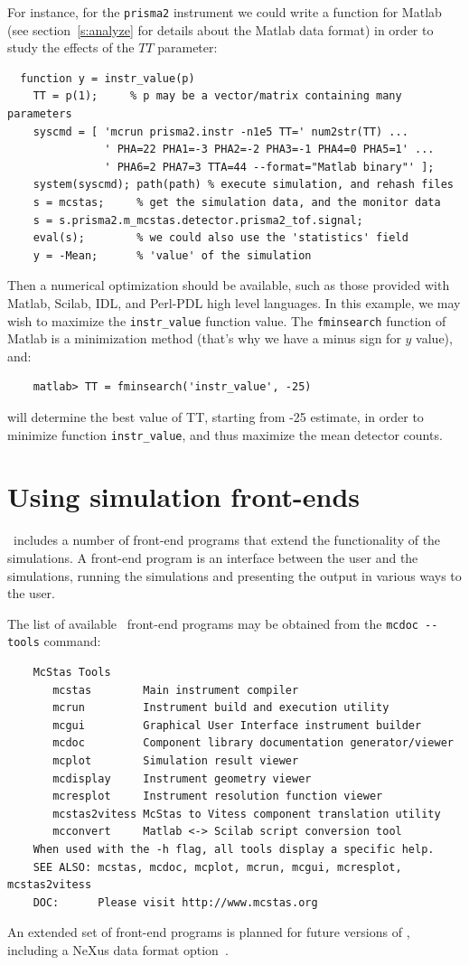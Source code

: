 For instance, for the \verb+prisma2+ instrument we could write a function for Matlab (see section~\ref{s:analyze} for details about the Matlab data format) in order to study the effects of the $TT$ parameter:
\begin{verbatim}
  function y = instr_value(p)
    TT = p(1);     % p may be a vector/matrix containing many parameters
    syscmd = [ 'mcrun prisma2.instr -n1e5 TT=' num2str(TT) ...
               ' PHA=22 PHA1=-3 PHA2=-2 PHA3=-1 PHA4=0 PHA5=1' ...
               ' PHA6=2 PHA7=3 TTA=44 --format="Matlab binary"' ];
    system(syscmd); path(path) % execute simulation, and rehash files
    s = mcstas;     % get the simulation data, and the monitor data
    s = s.prisma2.m_mcstas.detector.prisma2_tof.signal;
    eval(s);        % we could also use the 'statistics' field
    y = -Mean;      % 'value' of the simulation
\end{verbatim}

Then a numerical optimization should be available, such as those provided with Matlab, Scilab, IDL, and Perl-PDL high level languages. In this example, we may wish to maximize the \verb+instr_value+ function value. The \verb+fminsearch+ function of Matlab is a minimization method (that's why we have a minus sign for $y$ value), and:
\begin{verbatim}
    matlab> TT = fminsearch('instr_value', -25)
\end{verbatim}
will determine the best value of TT, starting from -25 estimate, in order to minimize function \verb+instr_value+, and thus maximize the mean detector counts.

\section{Using simulation front-ends}
\label{s:frontends}

\MCS\ includes a number of front-end programs that extend the
functionality of the simulations. A front-end program is an interface
between the user and the simulations, running the simulations and
presenting the output in various ways to the user.

The list of available \MCS\ front-end programs may be obtained from the \verb+mcdoc --tools+ command:
\begin{verbatim}
    McStas Tools
       mcstas        Main instrument compiler
       mcrun         Instrument build and execution utility
       mcgui         Graphical User Interface instrument builder
       mcdoc         Component library documentation generator/viewer
       mcplot        Simulation result viewer
       mcdisplay     Instrument geometry viewer
       mcresplot     Instrument resolution function viewer
       mcstas2vitess McStas to Vitess component translation utility
       mcconvert     Matlab <-> Scilab script conversion tool
    When used with the -h flag, all tools display a specific help.
    SEE ALSO: mcstas, mcdoc, mcplot, mcrun, mcgui, mcresplot, mcstas2vitess
    DOC:      Please visit http://www.mcstas.org
\end{verbatim}
An extended set of front-end programs is planned for future versions of
\MCS, including a NeXus data format option~\cite{nexus_webpage}.


